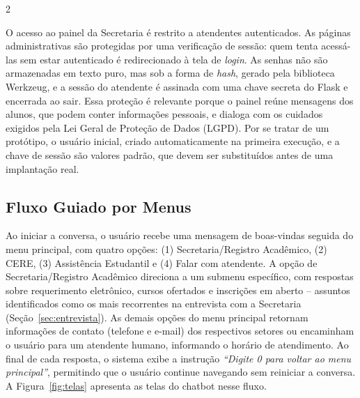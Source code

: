 \documentclass[10pt]{article}
\begin{document}
\begin{multicols}{2}

O acesso ao painel da Secretaria é restrito a atendentes autenticados. As
páginas administrativas são protegidas por uma verificação de sessão: quem
tenta acessá-las sem estar autenticado é redirecionado à tela de \textit{login}.
As senhas não são armazenadas em texto puro, mas sob a forma de \textit{hash},
gerado pela biblioteca Werkzeug, e a sessão do atendente é assinada com uma
chave secreta do Flask e encerrada ao sair. Essa proteção é relevante porque o
painel reúne mensagens dos alunos, que podem conter informações pessoais, e
dialoga com os cuidados exigidos pela Lei Geral de Proteção de Dados (LGPD).
Por se tratar de um protótipo, o usuário inicial, criado automaticamente na
primeira execução, e a chave de sessão são valores padrão, que devem ser
substituídos antes de uma implantação real.

\subsection{Fluxo Guiado por Menus}

Ao iniciar a conversa, o usuário recebe uma mensagem de boas-vindas
seguida do menu principal, com quatro opções: (1) Secretaria/Registro
Acadêmico, (2) CERE, (3) Assistência Estudantil e (4) Falar com
atendente. A opção de Secretaria/Registro Acadêmico direciona a um
submenu específico, com respostas sobre requerimento eletrônico, cursos
ofertados e inscrições em aberto -- assuntos identificados como os mais
recorrentes na entrevista com a Secretaria (Seção~\ref{sec:entrevista}). As demais opções do
menu principal retornam informações de contato (telefone e e-mail) dos
respectivos setores ou encaminham o usuário para um atendente humano,
informando o horário de atendimento. Ao final de cada resposta, o
sistema exibe a instrução \textit{``Digite 0 para voltar ao menu
principal''}, permitindo que o usuário continue navegando sem reiniciar a
conversa. A Figura~\ref{fig:telas} apresenta as telas do chatbot nesse fluxo.

\end{multicols}
\end{document}

